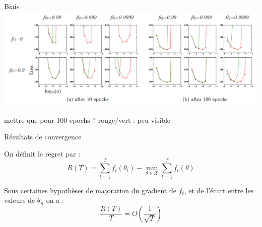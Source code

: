 \documentclass[11pt,aspectratio=169,xcolor=dvipsnames, french]{beamer}
\begin{document}
% 
% 
% 
% 
%  
% 
% 
%  
%  
% 
% 
% 
% 
%  
% 
% 

\begin{frame}{Biais}
\includegraphics[width=\linewidth]{../Images/bias_correction_article.png}

mettre que pour 100 epochs ? rouge/vert : peu visible
\end{frame}

\begin{frame}{Résultats de convergence}

On définit le regret par : $$R(T)=\sum_{t=1}^{T}f_t(\theta_t)-\min_{\theta\in\mathcal{X}}\sum_{t=1}^{T}f_t(\theta)$$

\begin{theorem}
  Sous certaines hypothèses de majoration du gradient de $f_t$, et de l'écart entre les valeurs de $\theta_n$ on a : 
    $$\frac{R(T)}{T}=O\left(\frac{1}{\sqrt{T}}\right)$$  
\end{theorem}

\end{frame}
\end{document}
